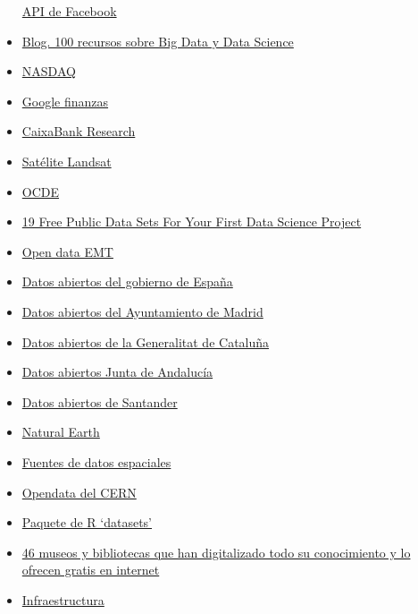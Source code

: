 \documentclass[]{article}
\begin{document}
\begin{itemize}
  \href{https://developers.facebook.com/docs/graph-api}{API de Facebook}
\item
  \href{http://todobi.blogspot.com.es/2015/02/mas-de-100-recursos-sobre-big-data-y.html}{Blog.
  100 recursos sobre Big Data y Data Science}
\item
  \href{https://indexes.nasdaqomx.com/Index/History/NQASPA8600AUD}{NASDAQ}
\item
  \href{http://www.google.com/finance/}{Google finanzas}
\item
  \href{http://www.caixabankresearch.com/es/home}{CaixaBank Research}
\item
  \href{https://aws.amazon.com/public-data-sets/landsat/}{Satélite
  Landsat}
\item
  \href{https://data.oecd.org/}{OCDE}
\item
  \href{https://www.mysliderule.com/blog/free-public-data-sets-data-science-project/?__s=atijywgwsusv7a2xfbee}{19
  Free Public Data Sets For Your First Data Science Project}
\item
  \href{http://opendata.emtmadrid.es/}{Open data EMT}
\item
  \href{http://datos.gob.es/}{Datos abiertos del gobierno de España}
\item
  \href{http://datos.madrid.es/}{Datos abiertos del Ayuntamiento de
  Madrid}
\item
  \href{http://dadesobertes.gencat.cat/es/}{Datos abiertos de la
  Generalitat de Cataluña}
\item
  \href{http://www.juntadeandalucia.es/datosabiertos/portal.html}{Datos
  abiertos Junta de Andalucía}
\item
  \href{http://datos.santander.es/}{Datos abiertos de Santander}
\item
  \href{http://www.naturalearthdata.com/}{Natural Earth}
\item
  \href{http://www.diva-gis.org/Data}{Fuentes de datos espaciales}
\item
  \href{http://opendata.cern.ch/}{Opendata del CERN}
\item
  \href{http://stat.ethz.ch/R-manual/R-patched/library/datasets/html/00Index.html}{Paquete
  de R `datasets'}
\item
  \href{http://www.xataka.com/otros/46-museos-y-bibliotecas-que-han-digitalizado-todo-su-conocimiento-humano}{46
  museos y bibliotecas que han digitalizado todo su conocimiento y lo
  ofrecen gratis en internet}
\item
  \href{http://idee.es/web/guest/centros-de-descarga?p_p_id=NewCentrosDescarga_WAR_NewCentrosDescargaportlet\&p_p_lifecycle=1\&p_p_state=normal\&p_p_mode=view\&p_p_col_id=column-1\&p_p_col_count=1\&_NewCentrosDescarga_WAR_NewCentrosDescargaportlet_tipoAmbito=LOCAL}{Infraestructura
}
\end{itemize}
\end{document}
